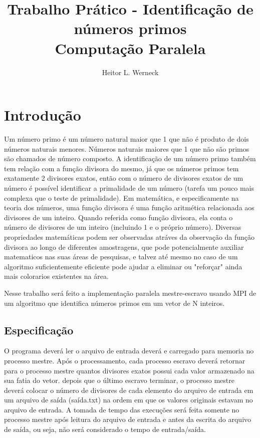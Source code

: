 \documentclass{article}
\title{Trabalho Prático - Identificação de números primos \\
	\large Computação Paralela}
\author{Heitor L. Werneck}
\begin{document}
\maketitle

\section{Introdução}

Um número primo é um número natural maior que 1 que não é produto de dois
números naturais menores. Números naturais maiores que 1 que não são primos são
chamados de número composto. A identificação de um número primo também tem
relação com a função divisora do mesmo, já que os números primos tem exatamente
2 divisores exatos, então com o número de divisores exatos de um número é
possível identificar a primalidade de um número (tarefa um pouco mais complexa
que o teste de primalidade). Em matemática, e especificamente na teoria dos
números, uma função divisora é uma função aritmética relacionada aos divisores
de um inteiro. Quando referida como função divisora, ela conta o número de
divisores de um inteiro (incluindo 1 e o próprio número). Diversas propriedades
matemáticas podem ser observadas atráves da observação da função divisora ao
longo de diferentes amostragens, que pode potencialmente auxiliar matematicos
nas suas áreas de pesquisas, e talvez até mesmo no caso de um algoritmo
suficientemente eficiente pode ajudar a eliminar ou "reforçar" ainda mais
colorarios existentes na área.

Nesse trabalho será feito a implementação paralela mestre-escravo usando MPI de um algoritmo que identifica números primos em um vetor de N inteiros.

\subsection{Especificação}
O programa deverá ler o arquivo de entrada deverá e carregado para memoria no
processo mestre. Após o processamento, cada processo escravo deverá retornar
para
o processo mestre quantos divisores exatos possui cada valor armazenado na
sua fatia do vetor. depois que o último escravo terminar, o processo mestre
deverá colocar o número de divisores de cada elemento do arquivo de entrada
em um arquivo de saída (saída.txt) na ordem em que os valores originais
estavam no arquivo de entrada. A tomada de tempo das execuções será
feita somente no processo mestre após leitura do arquivo de entrada e antes
da escrita do arquivo de saída, ou seja,
não será considerado o tempo de
entrada/saída.
\end{document}
